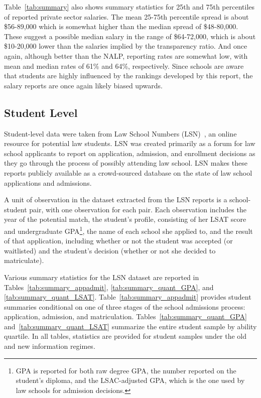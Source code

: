 \documentclass[12pt]{article}
\theoremstyle{definition}
\begin{document}
Table~\ref{tab:summary} also shows summary statistics for 25th and 75th percentiles of reported private sector salaries. The mean 25-75th percentile spread is about \$56-89,000 which is somewhat higher than the median spread of \$48-80,000. These suggest a possible median salary in the range of \$64-72,000, which is about \$10-20,000 lower than the salaries implied by the transparency ratio. And once again, although better than the NALP, reporting rates are somewhat low, with mean and median rates of 61\% and 64\%, respectively. Since schools are aware that students are highly influenced by the rankings developed by this report, the salary reports are once again likely biased upwards.

\subsection{Student Level}
\label{sec:data_student}

Student-level data were taken from Law School Numbers (LSN)~\cite{lsn}, an online resource for potential law students. LSN was created primarily as a forum for law school applicants to report on application, admission, and enrollment decisions as they go through the process of possibly attending law school. LSN makes these reports publicly available as a crowd-sourced database on the state of law school applications and admissions.

A unit of observation in the dataset extracted from the LSN reports is a school-student pair, with one observation for each pair. Each observation includes the year of the potential match, the student's profile, consisting of her LSAT score and undergraduate GPA\footnote{GPA is reported for both raw degree GPA, the number reported on the student's diploma, and the LSAC-adjusted GPA, which is the one used by law schools for admission decisions.}, the name of each school she applied to, and the result of that application, including whether or not the student was accepted (or waitlisted) and the student's decision (whether or not she decided to matriculate).

Various summary statistics for the LSN dataset are reported in Tables~\ref{tab:summary_appadmit}, \ref{tab:summary_quant_GPA}, and \ref{tab:summary_quant_LSAT}. Table~\ref{tab:summary_appadmit} provides student summaries conditional on one of three stages of the school admissions process: application, admission, and matriculation. Tables~\ref{tab:summary_quant_GPA} and~\ref{tab:summary_quant_LSAT} summarize the entire student sample by ability quartile. In all tables, statistics are provided for student samples under the old and new information regimes.
\end{document}
